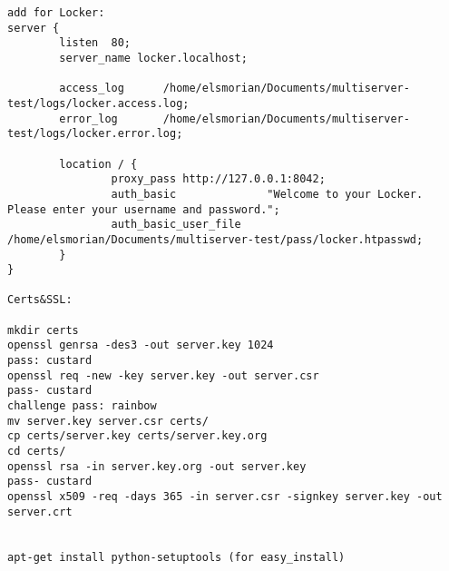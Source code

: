 \documentclass[A4paper,11pt]{article}
\begin{document}
\begin{lstlisting}
add for Locker:
server {
        listen  80;
        server_name locker.localhost;

        access_log      /home/elsmorian/Documents/multiserver-test/logs/locker.access.log;
        error_log       /home/elsmorian/Documents/multiserver-test/logs/locker.error.log;

        location / {
                proxy_pass http://127.0.0.1:8042;
                auth_basic              "Welcome to your Locker. Please enter your username and password.";
                auth_basic_user_file    /home/elsmorian/Documents/multiserver-test/pass/locker.htpasswd;
        }
}

Certs&SSL:

mkdir certs
openssl genrsa -des3 -out server.key 1024
pass: custard
openssl req -new -key server.key -out server.csr
pass- custard
challenge pass: rainbow
mv server.key server.csr certs/
cp certs/server.key certs/server.key.org
cd certs/
openssl rsa -in server.key.org -out server.key
pass- custard
openssl x509 -req -days 365 -in server.csr -signkey server.key -out server.crt


apt-get install python-setuptools (for easy_install)

\end{lstlisting}
\end{document}
